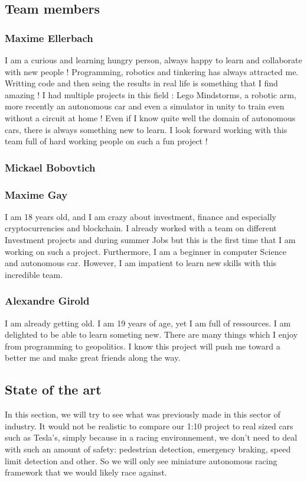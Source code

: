 \documentclass[12pt]{article}
\begin{document}
\subsection{Team members}

\subsubsection{Maxime Ellerbach}
I am a curious and learning hungry person, always happy to learn and collaborate with new people ! Programming, robotics and tinkering has always attracted me. Writting code and then seing the results in real life is something that I find amazing ! I had multiple projects in this field : Lego Mindstorms, a robotic arm, more recently an autonomous car and even a simulator in unity to train even without a circuit at home ! Even if I know quite well the domain of autonomous cars, there is always something new to learn. I look forward working with this team full of hard working people  on such a fun project !

\subsubsection{Mickael Bobovtich}

\subsubsection{Maxime Gay}
I am 18 years old,  and I am crazy about investment, finance and especially cryptocurrencies and blockchain. I already worked with a team on different Investment projects and during summer Jobs but this is the first time that I am working on such a  project. Furthermore, I am a beginner in computer Science and autonomous car. However, I am impatient to learn new skills with this incredible team. 

\subsubsection{Alexandre Girold}
I am already getting old. I am 19 years of age, yet I am full of ressources. I am delighted to be able to learn someting new. There are many things which I enjoy from programming to geopolitics. I know this project will push me toward a better me and make great friends along the way. 

\subsection{State of the art}
In this section, we will try to see what was previously made in this sector of industry.
It would not be realistic to compare our 1:10 project to real sized cars such as Tesla's, simply because in a racing environnement,
we don't need to deal with such an amount of safety: pedestrian detection, emergency braking, speed limit detection and other.
So we will only see miniature autonomous racing framework that we would likely race against.\\
\end{document}
